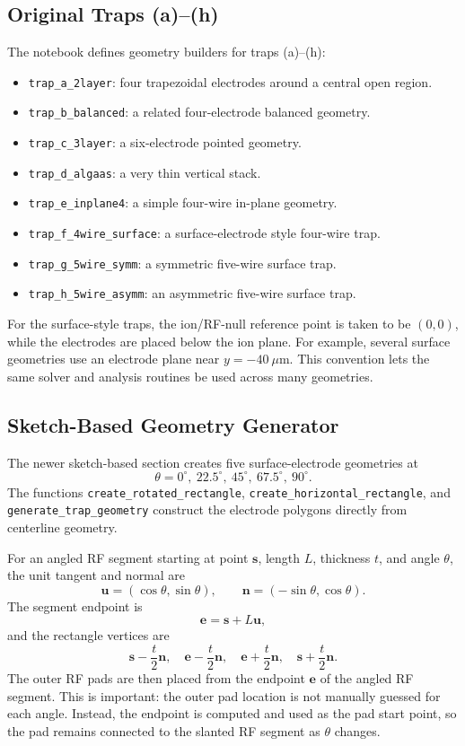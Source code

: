 \documentclass[11pt]{article}
\begin{document}
\subsection{Original Traps (a)--(h)}

The notebook defines geometry builders for traps (a)--(h):
\begin{itemize}
  \item \texttt{trap\_a\_2layer}: four trapezoidal electrodes around a central
        open region.
  \item \texttt{trap\_b\_balanced}: a related four-electrode balanced geometry.
  \item \texttt{trap\_c\_3layer}: a six-electrode pointed geometry.
  \item \texttt{trap\_d\_algaas}: a very thin vertical stack.
  \item \texttt{trap\_e\_inplane4}: a simple four-wire in-plane geometry.
  \item \texttt{trap\_f\_4wire\_surface}: a surface-electrode style
        four-wire trap.
  \item \texttt{trap\_g\_5wire\_symm}: a symmetric five-wire surface trap.
  \item \texttt{trap\_h\_5wire\_asymm}: an asymmetric five-wire surface trap.
\end{itemize}

For the surface-style traps, the ion/RF-null reference point is taken to be
\((0,0)\), while the electrodes are placed below the ion plane. For example,
several surface geometries use an electrode plane near \(y=-40\ \mu\mathrm{m}\).
This convention lets the same solver and analysis routines be used across many
geometries.

\subsection{Sketch-Based Geometry Generator}

The newer sketch-based section creates five surface-electrode geometries at
\[
  \theta = 0^\circ,\ 22.5^\circ,\ 45^\circ,\ 67.5^\circ,\ 90^\circ .
\]
The functions
\texttt{create\_rotated\_rectangle},
\texttt{create\_horizontal\_rectangle}, and
\texttt{generate\_trap\_geometry}
construct the electrode polygons directly from centerline geometry.

For an angled RF segment starting at point \(\mathbf{s}\), length \(L\),
thickness \(t\), and angle \(\theta\), the unit tangent and normal are
\[
  \mathbf{u} = (\cos\theta,\sin\theta), \qquad
  \mathbf{n} = (-\sin\theta,\cos\theta).
\]
The segment endpoint is
\[
  \mathbf{e} = \mathbf{s} + L\mathbf{u},
\]
and the rectangle vertices are
\[
  \mathbf{s}-\frac{t}{2}\mathbf{n},\quad
  \mathbf{e}-\frac{t}{2}\mathbf{n},\quad
  \mathbf{e}+\frac{t}{2}\mathbf{n},\quad
  \mathbf{s}+\frac{t}{2}\mathbf{n}.
\]
The outer RF pads are then placed from the endpoint \(\mathbf{e}\) of the
angled RF segment. This is important: the outer pad location is not manually
guessed for each angle. Instead, the endpoint is computed and used as the pad
start point, so the pad remains connected to the slanted RF segment as
\(\theta\) changes.
\end{document}
